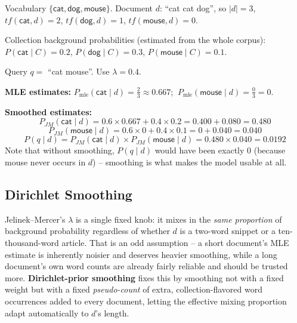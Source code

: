 \documentclass[11pt, a4paper]{article}
\begin{document}
\begin{examplebox}
Vocabulary $\{\textsf{cat},\textsf{dog},\textsf{mouse}\}$. Document $d$: ``\textsf{cat cat dog}'', so $|d|=3$, $tf(\textsf{cat},d)=2$, $tf(\textsf{dog},d)=1$, $tf(\textsf{mouse},d)=0$.

Collection background probabilities (estimated from the whole corpus): $P(\textsf{cat}\mid C)=0.2$, $P(\textsf{dog}\mid C)=0.3$, $P(\textsf{mouse}\mid C)=0.1$.

Query $q = $ ``\textsf{cat mouse}''. Use $\lambda=0.4$.

\textbf{MLE estimates:} $P_{\text{mle}}(\textsf{cat}\mid d)=\tfrac23\approx0.667$; $\ P_{\text{mle}}(\textsf{mouse}\mid d) = \tfrac03 = 0$.

\textbf{Smoothed estimates:}
\[
P_{JM}(\textsf{cat}\mid d) = 0.6\times0.667 + 0.4\times0.2 = 0.400+0.080 = 0.480
\]
\[
P_{JM}(\textsf{mouse}\mid d) = 0.6\times0 + 0.4\times0.1 = 0+0.040 = 0.040
\]
\[
P(q\mid d) = P_{JM}(\textsf{cat}\mid d)\times P_{JM}(\textsf{mouse}\mid d) = 0.480 \times 0.040 = 0.0192
\]
Note that without smoothing, $P(q\mid d)$ would have been exactly $0$ (because \textsf{mouse} never occurs in $d$) -- smoothing is what makes the model usable at all.
\end{examplebox}

\subsection{Dirichlet Smoothing}

Jelinek--Mercer's $\lambda$ is a single fixed knob: it mixes in the \emph{same proportion} of background probability regardless of whether $d$ is a two-word snippet or a ten-thousand-word article. That is an odd assumption -- a short document's MLE estimate is inherently noisier and deserves heavier smoothing, while a long document's own word counts are already fairly reliable and should be trusted more. \textbf{Dirichlet-prior smoothing} fixes this by smoothing not with a fixed weight but with a fixed \emph{pseudo-count} of extra, collection-flavored word occurrences added to every document, letting the effective mixing proportion adapt automatically to $d$'s length.
\end{document}
